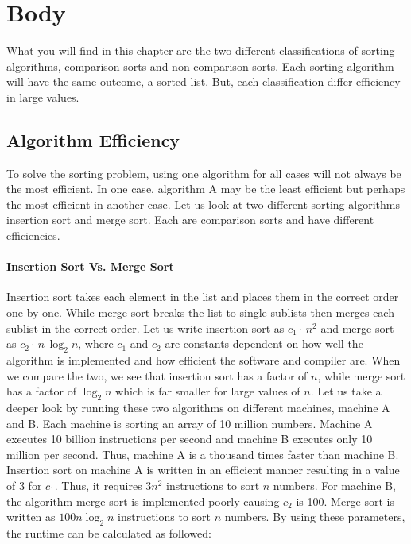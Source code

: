 \documentclass[12pt]{article}
\begin{document}
	\section{Body}
	
	What you will find in this chapter are the two different classifications of sorting algorithms, comparison sorts and non-comparison sorts.
	Each sorting algorithm will have the same outcome, a sorted list.
	But, each classification differ efficiency in large values.
	
	\subsection{Algorithm Efficiency}
	
	To solve the sorting problem, using one algorithm for all cases will not always be the most efficient.
	In one case, algorithm A may be the least efficient but perhaps the most efficient in another case.
	Let us look at two different sorting algorithms insertion sort and merge sort.
	Each are comparison sorts and have different efficiencies.
	
	\paragraph{Insertion Sort Vs. Merge Sort}
	
	Insertion sort takes each element in the list and places them in the correct order one by one.
	While merge sort breaks the list to single sublists then merges each sublist in the correct order.
	Let us write insertion sort as $c_1 \cdot\,n^2$ and merge sort as $c_2 \cdot\,n\,\log_2{n}$, where $c_1$ and $c_2$ are constants dependent on how well the algorithm is implemented and how efficient the software and compiler are.
	When we compare the two, we see that insertion sort has a factor of $n$, while merge sort has a factor of $\log_2{n}$ which is far smaller for large values of $n$.
	Let us take a deeper look by running these two algorithms on different machines, machine A and B.
	Each machine is sorting an array of 10 million numbers.
	Machine A executes 10 billion instructions per second and machine B executes only 10 million per second.
	Thus, machine A is a thousand times faster than machine B.
	Insertion sort on machine A is written in an efficient manner resulting in a value of 3 for $c_1$.
	Thus, it requires $3n^2$ instructions to sort $n$ numbers.
	For machine B, the algorithm merge sort is implemented poorly causing $c_2$ is 100.
	Merge sort is written as $100 n\log_2{n}$ instructions to sort $n$ numbers.
	By using these parameters, the runtime can be calculated as followed:
	
\end{document}
